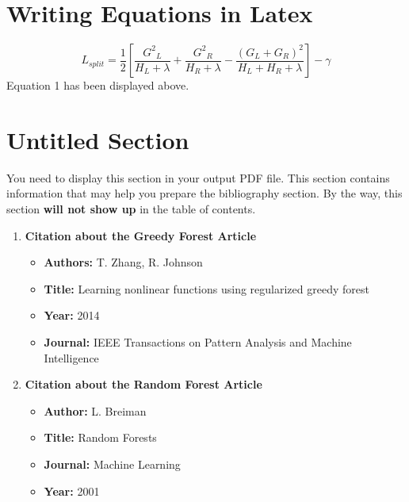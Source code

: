 \documentclass[11pt]{article}
\begin{document}
\section{Writing Equations in Latex}
\begin{equation}
    L_{split}=\frac{1}{2}\left[\frac{{G^2}_L}{H_L+\lambda}+\frac{{G^2}_R}{H_R+\lambda}-\frac{(G_L+G_R)^2}{H_L+H_R+\lambda}\right]-\gamma
\end{equation}
Equation 1 has been displayed above.\cite{ml}

\section*{Untitled Section}
You need to display this section in your output PDF file. This section contains information that may help you prepare the bibliography section. By the way, this section \textbf{will not show up} in the table of contents.
\begin{enumerate}
    \item \textbf{Citation about the Greedy Forest Article}
    \begin{itemize}
        \item \textbf{Authors:} T. Zhang, R. Johnson
        \item \textbf{Title:} Learning nonlinear functions using regularized greedy forest
        \item \textbf{Year:} 2014
        \item \textbf{Journal:} IEEE Transactions on Pattern Analysis and Machine Intelligence
    \end{itemize}
    \item \textbf{Citation about the Random Forest Article}
    \begin{itemize}
        \item \textbf{Author:} L. Breiman
        \item \textbf{Title:} Random Forests
        \item \textbf{Journal:} Machine Learning 
        \item \textbf{Year:} 2001
    \end{itemize}
\end{enumerate}



\end{document}
